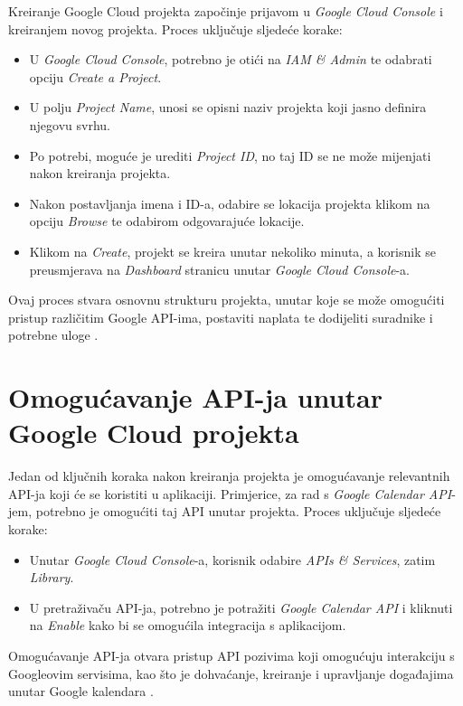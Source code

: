 \documentclass{foi}
\begin{document}
Kreiranje Google Cloud projekta započinje prijavom u \textit{Google Cloud Console} i kreiranjem novog projekta. Proces uključuje sljedeće korake:
\begin{itemize}
    \item U \textit{Google Cloud Console}, potrebno je otići na \textit{IAM \& Admin} te odabrati opciju \textit{Create a Project}.
    \item U polju \textit{Project Name}, unosi se opisni naziv projekta koji jasno definira njegovu svrhu.
    \item Po potrebi, moguće je urediti \textit{Project ID}, no taj ID se ne može mijenjati nakon kreiranja projekta.
    \item Nakon postavljanja imena i ID-a, odabire se lokacija projekta klikom na opciju \textit{Browse} te odabirom odgovarajuće lokacije.
    \item Klikom na \textit{Create}, projekt se kreira unutar nekoliko minuta, a korisnik se preusmjerava na \textit{Dashboard} stranicu unutar \textit{Google Cloud Console}-a.
\end{itemize}

Ovaj proces stvara osnovnu strukturu projekta, unutar koje se može omogućiti pristup različitim Google API-ima, postaviti naplata te dodijeliti suradnike i potrebne uloge \cite{GoogleWorkspace2024}.

\section{Omogućavanje API-ja unutar Google Cloud projekta}

Jedan od ključnih koraka nakon kreiranja projekta je omogućavanje relevantnih API-ja koji će se koristiti u aplikaciji. Primjerice, za rad s \textit{Google Calendar API}-jem, potrebno je omogućiti taj API unutar projekta. Proces uključuje sljedeće korake:
\begin{itemize}
    \item Unutar \textit{Google Cloud Console}-a, korisnik odabire \textit{APIs \& Services}, zatim \textit{Library}.
    \item U pretraživaču API-ja, potrebno je potražiti \textit{Google Calendar API} i kliknuti na \textit{Enable} kako bi se omogućila integracija s aplikacijom.
\end{itemize}

Omogućavanje API-ja otvara pristup API pozivima koji omogućuju interakciju s Googleovim servisima, kao što je dohvaćanje, kreiranje i upravljanje događajima unutar Google kalendara \cite{GoogleWorkspace2024}.
\end{document}
